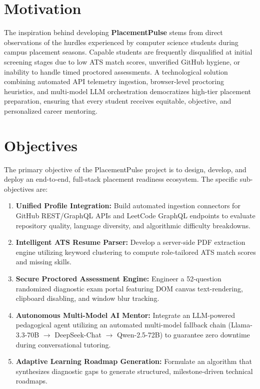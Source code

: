 \section{Motivation}
The inspiration behind developing \textbf{PlacementPulse} stems from direct observations of the hurdles experienced by computer science students during campus placement seasons. Capable students are frequently disqualified at initial screening stages due to low ATS match scores, unverified GitHub hygiene, or inability to handle timed proctored assessments. A technological solution combining automated API telemetry ingestion, browser-level proctoring heuristics, and multi-model LLM orchestration democratizes high-tier placement preparation, ensuring that every student receives equitable, objective, and personalized career mentoring.

\section{Objectives}
The primary objective of the PlacementPulse project is to design, develop, and deploy an end-to-end, full-stack placement readiness ecosystem. The specific sub-objectives are:
\begin{enumerate}
    \item \textbf{Unified Profile Integration:} Build automated ingestion connectors for GitHub REST/GraphQL APIs and LeetCode GraphQL endpoints to evaluate repository quality, language diversity, and algorithmic difficulty breakdowns.
    \item \textbf{Intelligent ATS Resume Parser:} Develop a server-side PDF extraction engine utilizing keyword clustering to compute role-tailored ATS match scores and missing skills.
    \item \textbf{Secure Proctored Assessment Engine:} Engineer a 52-question randomized diagnostic exam portal featuring DOM canvas text-rendering, clipboard disabling, and window blur tracking.
    \item \textbf{Autonomous Multi-Model AI Mentor:} Integrate an LLM-powered pedagogical agent utilizing an automated multi-model fallback chain (Llama-3.3-70B $\rightarrow$ DeepSeek-Chat $\rightarrow$ Qwen-2.5-72B) to guarantee zero downtime during conversational tutoring.
    \item \textbf{Adaptive Learning Roadmap Generation:} Formulate an algorithm that synthesizes diagnostic gaps to generate structured, milestone-driven technical roadmaps.
\end{enumerate}

